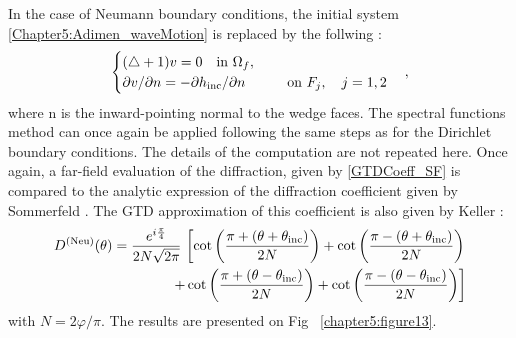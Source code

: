 In the case of Neumann boundary conditions, the initial system \eqref{Chapter5:Adimen_waveMotion} is replaced by the follwing :
\begin{equation}
\begin{cases}
(\triangle+1)v =  0 \quad \text{in } \Omega_f, \\
\partial v/\partial n =  -\partial h_{\rm inc}/\partial n \quad \quad \quad \text{on } F_j, \quad j=1,2
\end{cases},
\label{neuproblem}
\end{equation}
where n is the inward-pointing normal to the wedge faces. The spectral functions method can once again be applied following the same steps as for the Dirichlet boundary conditions. The details of the computation are not repeated here. Once again, a far-field evaluation of the diffraction, given by  \eqref{GTDCoeff_SF} is compared to the analytic expression of the diffraction coefficient given by Sommerfeld \cite{Sommerfeld}. The GTD approximation of this coefficient is also given by Keller \cite{GTD} :
\begin{align}
\label{GTDCoeff_Neu}
D^{\rm (Neu)}(\theta) = \dfrac{e^{i\frac{\pi}{4}}}{2N \sqrt{2\pi}}  \, \left[ \cot \left( \dfrac{\pi + (\theta + \theta_{\rm inc})}{2N} \right) + \cot \left( \dfrac{\pi - (\theta + \theta_{\rm inc})}{2N} \right) \right.   \nonumber \\
\left. + \cot \left( \dfrac{\pi + (\theta - \theta_{\rm inc})}{2N} \right) + \cot \left( \dfrac{\pi - (\theta - \theta_{\rm inc})}{2N} \right) \right] 
\end{align}
with $N=2\varphi/\pi$. The results are presented on Fig ~\ref{chapter5:figure13}.

